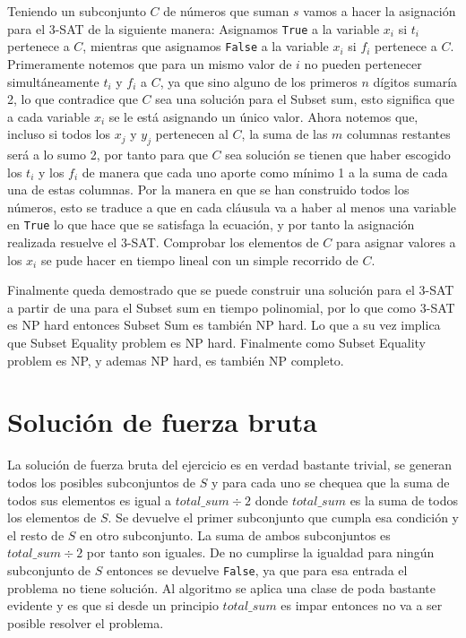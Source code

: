\documentclass[11pt]{article}
\begin{document}
    Teniendo un subconjunto $C$ de números que suman $s$ vamos a hacer la asignación para el 3-SAT de la siguiente manera:
    Asignamos \texttt{True} a la variable $x_i$ si $t_i$ pertenece a $C$, mientras que asignamos \texttt{False} a la variable 
    $x_i$ si $f_i$ pertenece a $C$. Primeramente notemos que para un mismo valor de $i$ no pueden pertenecer simultáneamente 
    $t_i$ y $f_i$ a $C$, ya que sino alguno de los primeros $n$ dígitos sumaría 2, lo que contradice que $C$ sea una solución 
    para el Subset sum, esto significa que a cada variable $x_i$ se le está asignando un único valor. Ahora notemos que, incluso 
    si todos los $x_j$ y $y_j$ pertenecen al $C$, la suma de las $m$ columnas restantes será a lo sumo 2, por tanto para que $C$
    sea solución se tienen que haber escogido los $t_i$ y los $f_i$ de manera que cada uno aporte como mínimo 1 a la suma de
    cada una de estas columnas. Por la manera en que se han construido todos los números, esto se traduce a que en cada cláusula
    va a haber al menos una variable en \texttt{True} lo que hace que se satisfaga la ecuación, y por tanto la asignación
    realizada resuelve el 3-SAT. Comprobar los elementos de $C$ para asignar valores a los $x_i$ se pude hacer en tiempo lineal
    con un simple recorrido de $C$.

    Finalmente queda demostrado que se puede construir una solución para el 3-SAT a partir de una para el Subset sum en tiempo
    polinomial, por lo que como 3-SAT es NP hard entonces Subset Sum es también NP hard. Lo que a su vez implica que Subset Equality
    problem es NP hard. Finalmente como Subset Equality problem es NP, y ademas NP hard, es también NP completo.

    \section{Solución de fuerza bruta}
    La solución de fuerza bruta del ejercicio es en verdad bastante trivial, se generan todos los posibles subconjuntos de $S$
    y para cada uno se chequea que la suma de todos sus elementos es igual a $total\_sum \div 2$ donde $total\_sum$ es la suma de
    todos los elementos de $S$. Se devuelve el primer subconjunto que cumpla esa condición y el resto de $S$ en otro subconjunto.
    La suma de ambos subconjuntos es $total\_sum \div 2$ por tanto son iguales. De no cumplirse la igualdad para ningún subconjunto
    de $S$ entonces se devuelve \texttt{False}, ya que para esa entrada el problema no tiene solución. Al algoritmo se aplica una
    clase de poda bastante evidente y es que si desde un principio $total\_sum$ es impar entonces no va a ser posible resolver el 
    problema.
\end{document}
